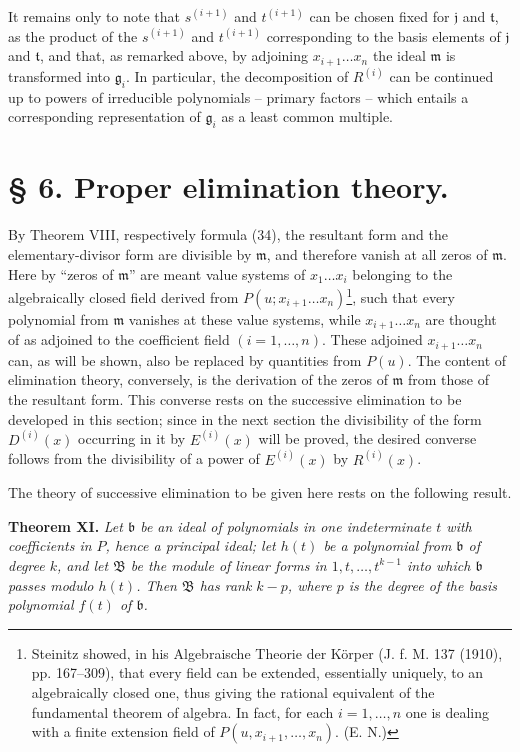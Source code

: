 \documentclass[11pt]{article}
\providecommand{\Bmod}{\mathfrak B}
\providecommand{\mideal}{\mathfrak m}
\providecommand{\gideal}{\mathfrak g}
\providecommand{\Bmod}{\mathfrak B}
\providecommand{\mideal}{\mathfrak m}
\providecommand{\gideal}{\mathfrak g}
\providecommand{\jideal}{\mathfrak j}
\providecommand{\tideal}{\mathfrak t}
\providecommand{\bideal}{\mathfrak b}
\begin{document}
It remains only to note that $s^{(i+1)}$ and $t^{(i+1)}$ can be chosen fixed for $\jideal$ and $\tideal$, as the product of the $s^{(i+1)}$ and $t^{(i+1)}$ corresponding to the basis elements of $\jideal$ and $\tideal$, and that, as remarked above, by adjoining $x_{i+1}\ldots x_n$ the ideal $\mideal$ is transformed into $\gideal_i$. In particular, the decomposition of $R^{(i)}$ can be continued up to powers of irreducible polynomials -- primary factors -- which entails a corresponding representation of $\gideal_i$ as a least common multiple.

\section*{§ 6. Proper elimination theory.}

By Theorem VIII, respectively formula (34), the resultant form and the elementary-divisor form are divisible by $\mideal$, and therefore vanish at all zeros of $\mideal$. Here by ``zeros of $\mideal$'' are meant value systems of $x_1\ldots x_i$ belonging to the algebraically closed field derived from $P(u;x_{i+1}\ldots x_n)$\footnote{Steinitz showed, in his Algebraische Theorie der Körper (J. f. M. 137 (1910), pp. 167--309), that every field can be extended, essentially uniquely, to an algebraically closed one, thus giving the rational equivalent of the fundamental theorem of algebra. In fact, for each $i=1,\ldots,n$ one is dealing with a finite extension field of $P(u,x_{i+1},\ldots,x_n)$. (E. N.)}, such that every polynomial from $\mideal$ vanishes at these value systems, while $x_{i+1}\ldots x_n$ are thought of as adjoined to the coefficient field $(i=1,
\ldots,n)$. These adjoined $x_{i+1}\ldots x_n$ can, as will be shown, also be replaced by quantities from $P(u)$. The content of elimination theory, conversely, is the derivation of the zeros of $\mideal$ from those of the resultant form. This converse rests on the successive elimination to be developed in this section; since in the next section the divisibility of the form $D^{(i)}(x)$ occurring in it by $E^{(i)}(x)$ will be proved, the desired converse follows from the divisibility of a power of $E^{(i)}(x)$ by $R^{(i)}(x)$.

The theory of successive elimination to be given here rests on the following result.

\medskip
\noindent\textbf{Theorem XI.} \emph{Let $\bideal$ be an ideal of polynomials in one indeterminate $t$ with coefficients in $P$, hence a principal ideal; let $h(t)$ be a polynomial from $\bideal$ of degree $k$, and let $\Bmod$ be the module of linear forms in $1,t,\ldots,t^{k-1}$ into which $\bideal$ passes modulo $h(t)$. Then $\Bmod$ has rank $k-p$, where $p$ is the degree of the basis polynomial $f(t)$ of $\bideal$.}
\end{document}
